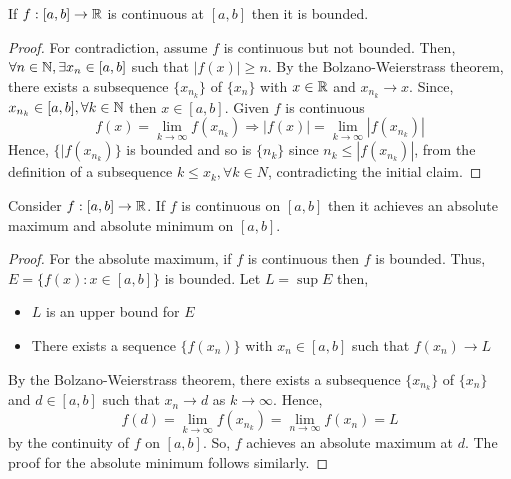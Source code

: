 \begin{theorem}
    If $f: [a,b] \to \mathbb{R}$ is continuous at $[a,b]$ then it is bounded.
\end{theorem}

\begin{proof}
    For contradiction, assume $f$ is continuous but not bounded. Then, $\forall n \in \mathbb{N}, \exists x_n \in [a,b]$ such that $|f(x)| \geq n$. By the Bolzano-Weierstrass theorem, there exists a subsequence $\{x_{n_k}\}$ of $\{x_n\}$ with $x \in \mathbb{R}$ and $x_{n_k} \to x$. Since, $x_{n_k} \in [a,b], \forall k \in \mathbb{N}$ then $x \in [a,b]$. Given $f$ is continuous
    \begin{equation*}
        f(x) = \lim \limits_{k \to \infty} f(x_{n_k}) \Longrightarrow |f(x)| = \lim \limits_{k \to \infty} |f(x_{n_k})|
    \end{equation*}
    Hence, $\{|f(x_{n_k})\}$ is bounded and so is $\{n_k\}$ since $n_k \leq |f(x_{n_k})|$, from the definition of a subsequence $k \leq x_k, \forall k \in N$, contradicting the initial claim.
\end{proof}

\begin{theorem}
    Consider $f: [a,b] \to \mathbb{R}$. If $f$ is continuous on $[a,b]$ then it achieves an absolute maximum and absolute minimum on $[a,b]$.
\end{theorem}

\begin{proof}
    For the absolute maximum, if $f$ is continuous then $f$ is bounded. Thus, $E = \{ f(x): x \in [a,b]\}$ is bounded. Let $L = \sup E$ then,
    \begin{itemize}
        \item $L$ is an upper bound for $E$
        \item There exists a sequence $\{f(x_n)\}$ with $x_n \in [a,b]$ such that $f(x_n) \to L$
    \end{itemize}
    By the Bolzano-Weierstrass theorem, there exists a subsequence $\{x_{n_k}\}$ of $\{x_n\}$ and $d \in [a,b]$ such that $x_n \to d$ as $k \to \infty$. Hence,
    \begin{equation*}
        f(d) = \lim \limits_{k \to \infty} f(x_{n_k}) = \lim \limits_{n \to \infty} f(x_n) = L
    \end{equation*}
    by the continuity of $f$ on $[a,b]$. So, $f$ achieves an absolute maximum at $d$.
    The proof for the absolute minimum follows similarly.
\end{proof}

